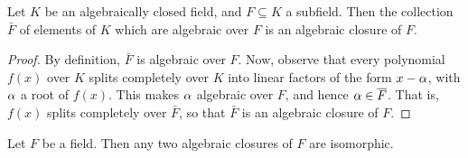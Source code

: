 \begin{proposition}\label{proposition_8.5.5}
  Let $K$ be an algebraically closed field, and $F \subseteq K$ a
  subfield. Then the collection $\bar{F}$ of elements of $K$ which are
  algebraic over $F$ is an algebraic closure of $F$.
\end{proposition}
\begin{proof}
  By definition, $\bar{F}$ is algebraic over $F$. Now, observe that
  every polynomial $f(x)$ over $K$ splits completely over  $K$ into
  linear factors of the form  $x-\alpha$, with  $\alpha$ a root of  $f(x)$.
  This makes $\alpha$ algebraic over  $F$, and hence  $\alpha \in \overline{F}$.
  That is, $f(x)$ splits completely over $\bar{F}$, so that $\bar{F}$
  is an algebraic closure of $F$.
\end{proof}

\begin{theorem}\label{theorem_8.5.6}
  Let $F$ be a field. Then any two algebraic closures of $F$ are
  isomorphic.
\end{theorem}
